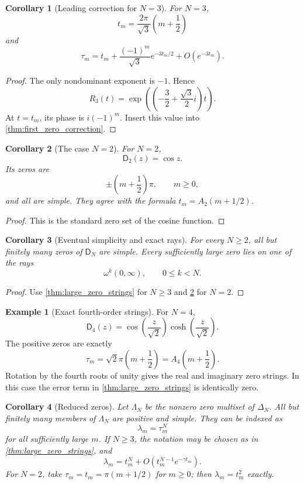 \documentclass[11pt]{article}
\newtheorem{corollary}[corollary]{Corollary}
\theoremstyle{definition}
\newtheorem{example}[example]{Example}
\theoremstyle{remark}
\newcommand{\Dfun}{\mathsf D}
\begin{document}
\begin{corollary}[Leading correction for $N=3$]\label{cor:N3_zero_correction}
For $N=3$,
\[
t_m=\frac{2\pi}{\sqrt3}\left(m+\frac12\right)
\]
and
\[
\tau_m
=
t_m+
\frac{(-1)^m}{\sqrt3}e^{-3t_m/2}
+
O(e^{-3t_m}).
\]
\end{corollary}

\begin{proof}
The only nondominant exponent is $-1$.  Hence
\[
R_3(t)
=
\exp\left(\left(-\frac32+\frac{\sqrt3}{2}i\right)t\right).
\]
At $t=t_m$, its phase is $i(-1)^m$.  Insert this value into \cref{thm:first_zero_correction}.
\end{proof}

\begin{corollary}[The case $N=2$]\label{cor:case_two_zeros}
For $N=2$,
\[
\Dfun_2(z)=\cos z.
\]
Its zeros are
\[
\pm\left(m+\frac12\right)\pi,
\qquad m\geq0,
\]
and all are simple.  They agree with the formula $t_m=A_2(m+1/2)$.
\end{corollary}

\begin{proof}
This is the standard zero set of the cosine function.
\end{proof}

\begin{corollary}[Eventual simplicity and exact rays]\label{cor:eventual_simplicity}
For every $N\geq2$, all but finitely many zeros of $\Dfun_N$ are simple.  Every sufficiently large zero lies on one of the rays
\[
\omega^k(0,\infty),
\qquad 0\leq k<N.
\]
\end{corollary}

\begin{proof}
Use \cref{thm:large_zero_strings} for $N\geq3$ and \cref{cor:case_two_zeros} for $N=2$.
\end{proof}


\begin{example}[Exact fourth-order strings]\label{ex:fourth_order_zeros}
For $N=4$,
\[
\Dfun_4(z)
=
\cos\left(\frac z{\sqrt2}\right)
\cosh\left(\frac z{\sqrt2}\right).
\]
The positive zeros are exactly
\[
\tau_m
=
\sqrt2\pi\left(m+\frac12\right)
=
A_4\left(m+\frac12\right).
\]
Rotation by the fourth roots of unity gives the real and imaginary zero strings.  In this case the error term in \cref{thm:large_zero_strings} is identically zero.
\end{example}

\begin{corollary}[Reduced zeros]\label{cor:reduced_zeros}
Let $\Lambda_N$ be the nonzero zero multiset of $\Delta_N$.  All but finitely many members of $\Lambda_N$ are positive and simple.  They can be indexed as
\[
\lambda_m=\tau_m^N
\]
for all sufficiently large $m$.  If $N\geq3$, the notation may be chosen
as in \cref{thm:large_zero_strings}, and
\[
\lambda_m
=
 t_m^N
+O\left(t_m^{N-1}e^{-\gamma t_m}\right).
\]
For $N=2$, take $\tau_m=t_m=\pi(m+1/2)$ for $m\geq0$; then
$\lambda_m=t_m^2$ exactly.
\end{corollary}
\end{document}
